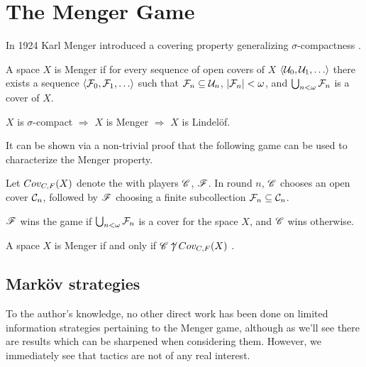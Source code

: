 
\chapter{The Menger Game}

In 1924 Karl Menger introduced a covering property generalizing
$\sigma$-compactness \cite{custom31879423}.

\begin{defn}
  A space $X$ is Menger if for every sequence of open covers of $X$
  $\<\mc U_0,\mc U_1,\dots\>$ there exists a sequence
  $\<\mc F_0,\mc F_1,\dots\>$ such that $\mathcal{F}_n\subseteq \mathcal{U}_n$,
  $|\mathcal{F}_n|<\omega$, and $\bigcup_{n<\omega}\mathcal{F}_n$ is a cover of $X$.
\end{defn}

\begin{prop}
  $X$ is $\sigma$-compact
    $\Rightarrow$
  $X$ is Menger
    $\Rightarrow$
  $X$ is Lindel\"of.
\end{prop}

It can be shown via a non-trivial proof that the following game can be
used to characterize the Menger property.

\begin{game}
  Let $Cov_{C,F}(X)$ denote the  with players $\mathscr{C}$, $\mathscr{F}$.
  In round $n$, $\mathscr{C}$ chooses an open cover $\mathcal{C}_n$, followed by $\mathscr{F}$
  choosing a finite subcollection $\mathcal{F}_n\subseteq \mathcal{C}_n$.

  $\mathscr{F}$ wins the game if $\bigcup_{n<\omega}\mathcal{F}_n$ is a cover for the space
  $X$, and $\mathscr{C}$ wins otherwise.
\end{game}

\begin{thm}
  A space $X$ is Menger if and only if $\mathscr{C}\not\uparrow Cov_{C,F}(X)$
  \cite{MR1544773}.
\end{thm}

\section{Mark\"ov strategies}

To the author's knowledge, no other direct work has been done on limited
information strategies pertaining to the Menger game, although as we'll see
there are results which can be sharpened when considering them.
However, we immediately see that tactics are not of any real interest.

